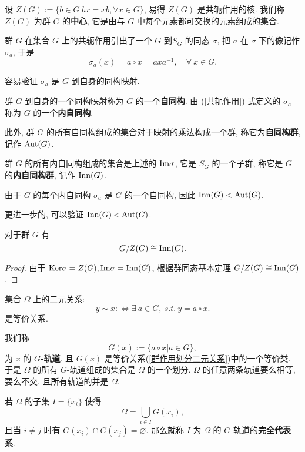 \begin{definition}\label{中心}
	设 $Z(G):=\{b\in G|bx=xb,\forall x\in G\}$, 易得 $Z(G)$ 是共轭作用的核. 我们称 $Z(G)$ 为群 $G$ 的\textbf{中心}, 它是由与 $G$ 中每个元素都可交换的元素组成的集合.
\end{definition}

群 $G$ 在集合 $G$ 上的共轭作用引出了一个 $G$ 到$S_G$ 的同态 $\sigma$, 把 $a$ 在 $\sigma$ 下的像记作 $\sigma_a$, 于是
\begin{equation}
	\sigma_a(x)=a\circ x=axa^{-1},\quad \forall\ x\in G.\label{共轭作用}
\end{equation}

容易验证 $\sigma_a$ 是 $G$ 到自身的同构映射.

\begin{definition}\label{自同构}
	群 $G$ 到自身的一个同构映射称为 $G$ 的一个\textbf{自同构}. 由 (\ref{共轭作用}) 式定义的 $\sigma_a$ 称为 $G$ 的一个\textbf{内自同构}.

	此外, 群 $G$ 的所有自同构组成的集合对于映射的乘法构成一个群, 称它为\textbf{自同构群}, 记作 $\text {Aut}(G)$.

	群 $G$ 的所有内自同构组成的集合是上述的 $\text {Im}\sigma$, 它是 $S_G$ 的一个子群, 称它是 $G$ 的\textbf{内自同构群}, 记作 $\text {Inn}(G)$.
\end{definition}

由于 $G$ 的每个内自同构 $\sigma_a$ 是 $G$ 的一个自同构, 因此 $\text {Inn}(G)<\text {Aut}(G)$.

更进一步的, 可以验证 $\text {Inn}(G)\lhd\text {Aut}(G)$.

\begin{theorem}
	对于群 $G$ 有 $$G/Z(G)\cong \text {Inn}(G).$$
\end{theorem}

\begin{proof}
	由于 $\text {Ker}\sigma=Z(G),\text {Im}\sigma=\text {Inn}(G)$, 根据群同态基本定理 $G/Z(G)\cong \text {Inn}(G)$.
\end{proof}

\begin{lemma}
	集合 $\Omega$ 上的二元关系:
	\begin{equation}
		y\sim x:\Leftrightarrow\exists\ a\in G,\ s.t.\ y=a\circ x.\label{群作用划分二元关系}
	\end{equation}
	是等价关系.
\end{lemma}

\begin{definition}\label{轨道}
	我们称 $$G(x):=\{a\circ x|a\in G\},$$ 为 $x$ 的 \textbf{$G$-轨道}. 且 $G(x)$ 是等价关系(\ref{群作用划分二元关系})中的一个等价类. 于是 $\Omega$ 的所有 $G$-轨道组成的集合是 $\Omega$ 的一个划分. $\Omega$ 的任意两条轨道要么相等, 要么不交. 且所有轨道的并是 $\Omega$.

	若 $\Omega$ 的子集 $I=\{x_i\}$ 使得
	\begin{equation}
		\Omega=\bigcup\limits_{i\in I}G(x_i),\label{轨道划分}
	\end{equation}
	且当 $i\neq j$ 时有 $G(x_i)\cap G(x_j)=\varnothing$. 那么就称 $I$ 为 $\Omega$ 的 $G$-轨道的\textbf{完全代表系}.
\end{definition}

